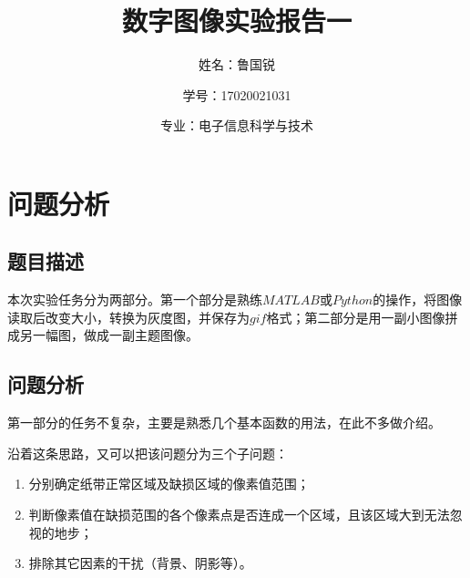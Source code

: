 \documentclass[UTF8]{ctexart}
\title{数字图像实验报告一}
\author{姓名：鲁国锐 \protect\newline
\and 学号：17020021031 \\
\and 专业：电子信息科学与技术}
\begin{document}
	\maketitle
	\renewcommand{\contentsname}{目录}
	\renewcommand{\listfigurename}{插图目录}
	\renewcommand{\listtablename}{表格目录}
	\renewcommand{\refname}{参考文献}
	\renewcommand{\abstractname}{摘要}
	\renewcommand{\indexname}{索引}
	\renewcommand{\tablename}{表}
	\renewcommand{\figurename}{图}
	\tableofcontents
	\newpage
	
	\hypersetup{
	bookmarks=true,
	colorlinks=true,
	linkcolor=red,
	urlcolor=blue
	}
	\section{问题分析}
	\subsection{题目描述}
	\indent 本次实验任务分为两部分。第一个部分是熟练$MATLAB$或$Python$的操作，将图像读取后改变大小，转换为灰度图，并保存为$gif$格式；第二部分是用一副小图像拼成另一幅图，做成一副主题图像。

%     

	\subsection{问题分析}\label{analysis}
	\indent 第一部分的任务不复杂，主要是熟悉几个基本函数的用法，在此不多做介绍。
	
	\indent 沿着这条思路，又可以把该问题分为三个子问题：
	\begin{enumerate}[leftmargin=50pt]
	\item 分别确定纸带正常区域及缺损区域的像素值范围；\label{problem1}
	\item 判断像素值在缺损范围的各个像素点是否连成一个区域，且该区域大到无法忽视的地步；\label{problem2}
	\item 排除其它因素的干扰（背景、阴影等）。\label{problem3}
	\end{enumerate}
	
\end{document}
